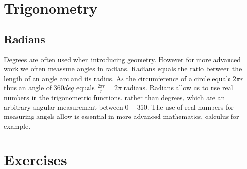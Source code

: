 \section{Trigonometry}

\subsection{Radians}
Degrees are often used when introducing geometry. However for more advanced  work we often meassure angles in radians. Radians equals the ratio between the length of an angle arc and its radius. As the circumference of a circle equals $2\pi r$ thus an angle of $360 deg$ equals $\frac{2\pi r}{r} = 2\pi$ radians. Radians allow us to use real numbers in the trigonometric functions, rather than degrees, which are an arbitrary angular measurement between $0-360$. The use of real numbers for measuring angels allow is essential in more advanced mathematics, calculus for example.

\section{Exercises}
\begin{ExerciseList}


\end{ExerciseList}
